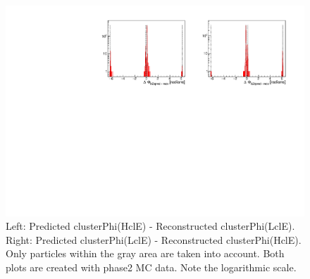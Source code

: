 \documentclass[a4paper,11pt,twosided,final,german,openbib,pdftex,listof=totoc,bibliography=totoc]{scrbook}
\begin{document}
\begin{appendix}
\begin{figure}[!htbp]
	\centering
	\includegraphics[width=\textwidth]{Plots/master/sb2b_MC_0.pdf}
	\caption[b2bClusterPhi - clusterPhi For MC (Whole Range)]{Left: Predicted clusterPhi(HclE) - Reconstructed clusterPhi(LclE). Right: Predicted clusterPhi(LclE) - Reconstructed clusterPhi(HclE). Only particles within the gray area are taken into account. Both plots are created with phase2 MC data. Note the logarithmic scale.}
	\label{fig:b2bMC_Whole}
\end{figure}
\newpage



\clearpage






\end{appendix}
\end{document}
